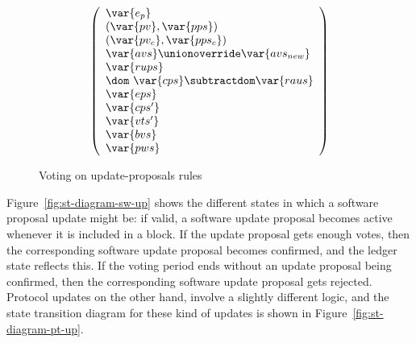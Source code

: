 \begin{figure}[htb]
\begin{equation}
{      {
        \left(
          \begin{array}{l}
            \var{e_p}\\
            (\var{pv}, \var{pps})\\
            (\var{pv_c}, \var{pps_c})\\
            \var{avs} \unionoverride \var{avs_{new}}\\
            \var{rups}\\
            \dom~ \var{cps} \subtractdom \var{raus}\\
            \var{eps}\\
            \var{cps'}\\
            \var{vts'}\\
            \var{bvs}\\
            \var{pws}
          \end{array}
        \right)
      }
    }
  \end{equation}
  \caption{Voting on update-proposals rules}
  \label{fig:rules:upi-vote}
\end{figure}

Figure~\ref{fig:st-diagram-sw-up} shows the different states in which a
software proposal update might be: if valid, a software update proposal becomes
active whenever it is included in a block. If the update proposal gets enough
votes, then the corresponding software update proposal becomes confirmed, and
the ledger state reflects this. If the voting period ends without an update
proposal being confirmed, then the corresponding software update proposal gets
rejected.
%
Protocol updates on the other hand, involve a slightly different logic, and the
state transition diagram for these kind of updates is shown in
Figure~\ref{fig:st-diagram-pt-up}.

